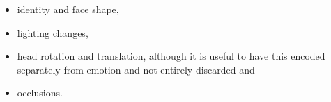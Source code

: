 \begin{itemize}
\item identity and face shape,
\item lighting changes,
\item head rotation and translation, although it is useful to have this encoded separately from emotion and not entirely discarded and
\item occlusions.
\end{itemize}


